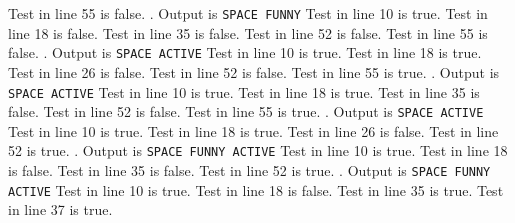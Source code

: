 Test in line 55 is false.
\bigbreak
\noindent\hrulefill{}. Output is {\tt SPACE FUNNY}\quad \hrulefill\null
\smallskip
{}
\medskip
\noindent Test in line 10 is true. Test in line 18 is false. Test in line 35 is false.
Test in line 52 is false.
Test in line 55 is false.
\bigbreak
\noindent\hrulefill{}. Output is {\tt SPACE ACTIVE}\quad \hrulefill\null
\smallskip
{}
\medskip
\noindent Test in line 10 is true. Test in line 18 is true. Test in line 26 is false.
Test in line 52 is false.
Test in line 55 is true.
\bigbreak
\noindent\hrulefill{}. Output is {\tt SPACE ACTIVE}\quad \hrulefill\null
\smallskip
{}
\medskip
\noindent Test in line 10 is true. Test in line 18 is true. Test in line 35 is false.
Test in line 52 is false.
Test in line 55 is true.
\bigbreak
\noindent\hrulefill{}. Output is {\tt SPACE ACTIVE}\quad \hrulefill\null
\smallskip
{}
\medskip
\noindent Test in line 10 is true. Test in line 18 is true. Test in line 26 is false.
Test in line 52 is true.
\bigbreak
\noindent\hrulefill{}. Output is {\tt SPACE FUNNY ACTIVE}\quad \hrulefill\null
\smallskip
{}
\medskip
\noindent Test in line 10 is true. Test in line 18 is false. Test in line 35 is false.
Test in line 52 is true.
\bigbreak
\noindent\hrulefill{}. Output is {\tt SPACE FUNNY ACTIVE}\quad \hrulefill\null
\smallskip
{}
\medskip
\noindent Test in line 10 is true. Test in line 18 is false. Test in line 35 is true.
Test in line 37 is true.
\bye
